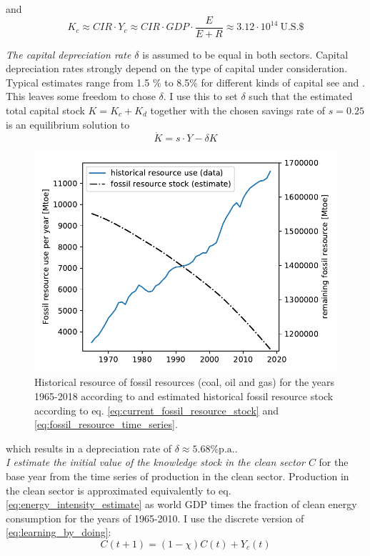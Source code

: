 and 
\begin{equation}
  K_c \approx CIR \cdot Y_c \approx CIR \cdot GDP \cdot \frac{E}{E + R} \approx 3.12 \cdot 10^{14} ~ \textrm{U.S.} \$
  \label{eq:approx_clean_capital}
\end{equation}

\textit{The capital depreciation rate $\delta$} is assumed to be equal in both sectors. Capital depreciation rates strongly depend on the type of capital under consideration. Typical estimates range from 1.5 \% to 8.5\% for different kinds of capital see \cite{Kamps2005} and \cite{Gupta2014}. This leaves some freedom to chose $\delta$. I use this to set $\delta$ such that the estimated total capital stock $K = K_c + K_d$ together with the chosen savings rate of $s=0.25$ is an equilibrium solution to 
\begin{equation}
  \dot{K} = s \cdot Y - \delta K
  \label{eq:delta_estimate}
\end{equation} 
\begin{figure}
	\vspace{-.4 cm}
        \includegraphics[width = .65 \textwidth]{./figures/fossil_resource_per_year.pdf}
        \caption{Historical resource of fossil resources (coal, oil and gas) for the years 1965-2018 according to \cite{dudley2019bp} and estimated historical fossil resource stock according to eq. \ref{eq:current_fossil_resource_stock} and \ref{eq:fossil_resource_time_series}. \label{fig:historical_resource_use}}
\end{figure}
which results in a depreciation rate of $\delta\approx 5.68 \% \mathrm{p.a.}$.\\

\textit{I estimate the initial value of the knowledge stock in the clean sector $C$} for the base year from the time series of production in the clean sector. Production in the clean sector is approximated equivalently to eq. \ref{eq:energy_intensity_estimate} as world GDP times the fraction of clean energy consumption for the years of 1965-2010. I use the discrete version of \eqref{eq:learning_by_doing}:
\begin{equation} 
  C(t+1) = (1-\chi)C(t) + Y_c(t)
  \label{eq:discrete_clean_knowledge}
\end{equation}

